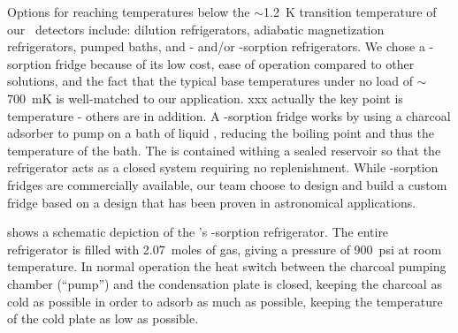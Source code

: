 Options for reaching temperatures below the $\sim$1.2~K transition temperature of our \TES\ detectors include: dilution refrigerators, adiabatic magnetization refrigerators, pumped  baths, and - and/or -sorption refrigerators.
We chose a -sorption fridge because of its low cost, ease of operation compared to other solutions, and the fact that the typical base temperatures under no load of $\sim$700~mK is well-matched to our application. xxx actually the key point is temperature - others are in addition.
A  -sorption fridge works by using a charcoal adsorber to pump on a bath of liquid , reducing the  boiling point and thus the temperature of the bath.
The  is contained withing a sealed reservoir so that the refrigerator acts as a closed system requiring no  replenishment. 
While -sorption fridges are commercially available, our team choose to design and build a custom fridge based on a design that has been proven in astronomical applications\cite{devlin_high_2004}.

 shows a schematic depiction of the \Imager's -sorption refrigerator.
The entire refrigerator is filled with 2.07~moles of  gas, giving a pressure of 900~psi at room temperature.
In normal operation the heat switch between the charcoal pumping chamber (``pump'') and the  condensation plate is closed, keeping the charcoal as cold as possible in order to adsorb as much  as possible, keeping the temperature of the cold plate as low as possible.

